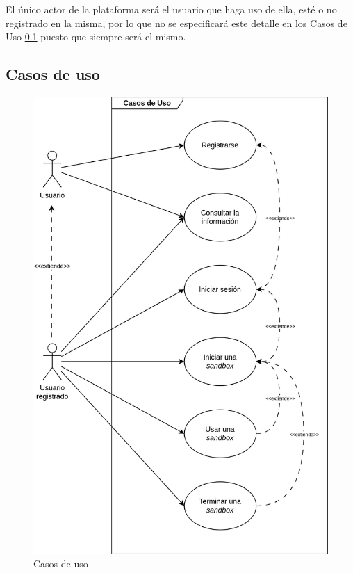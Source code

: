         
        
        El único actor de la plataforma será el usuario que haga uso de ella, esté o no registrado en la misma, por lo que no se especificará este detalle en los Casos de Uso \ref{sec:casos-uso} puesto que siempre será el mismo.
        
        
        \subsection{Casos de uso}
            \label{sec:casos-uso}
            
            \begin{figure}[h]
                \centering
                \includegraphics[scale=0.125]{images/Diagramas/Casos de uso.png}
                \caption{Casos de uso}
                \label{fig:casos-uso}
            \end{figure}
            
